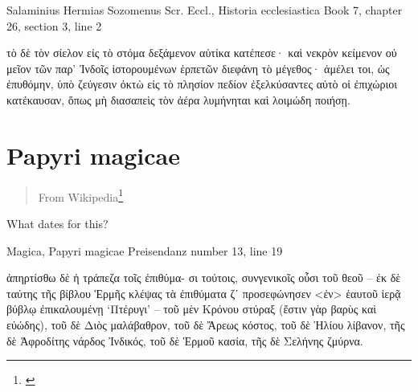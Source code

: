 \documentclass[12pt,letterpaper,twoside,final]{memoir}
\begin{document}
\begin{greek}
Salaminius Hermias Sozomenus Scr. Eccl., Historia ecclesiastica 
Book 7, chapter 26, section 3, line 2

       τὸ δὲ τὸν σίελον εἰς τὸ στόμα δεξάμενον αὐτίκα κατέπεσε· καὶ 
νεκρὸν κείμενον οὐ μεῖον τῶν παρ' Ἰνδοῖς ἱστορουμένων ἑρπετῶν διεφάνη 
τὸ μέγεθος· ἀμέλει τοι, ὡς ἐπυθόμην, ὑπὸ ζεύγεσιν ὀκτὼ εἰς τὸ πλησίον 
πεδίον ἐξελκύσαντες αὐτὸ οἱ ἐπιχώριοι κατέκαυσαν, ὅπως μὴ διασαπεὶς τὸν 
ἀέρα λυμήνηται καὶ λοιμώδη ποιήσῃ. 

\end{greek}

\section{Papyri magicae}%
\blockquote[From Wikipedia\footnote{\url{}}]{}
\begin{greek}

What dates for this?

Magica, Papyri magicae 
Preisendanz number 13, line 19

            ἀπηρτίσθω δὲ ἡ τράπεζα τοῖς ἐπιθύμα-
σι τούτοις, συνγενικοῖς οὖσι τοῦ θεοῦ – ἐκ δὲ ταύτης τῆς 
βίβλου Ἑρμῆς κλέψας τὰ ἐπιθύματα ζʹ προσεφώνησεν <ἐν> 
ἑαυτοῦ ἱερᾷ βύβλῳ ἐπικαλουμένῃ ‘Πτέρυγι’ – τοῦ μὲν 
Κρόνου στύραξ (ἔστιν γὰρ βαρὺς καὶ εὐώδης), τοῦ δὲ Διὸς 
μαλάβαθρον, τοῦ δὲ Ἄρεως κόστος, τοῦ δὲ Ἡλίου λίβανον, 
τῆς δὲ Ἀφροδίτης νάρδος Ἰνδικός, τοῦ δὲ Ἑρμοῦ κασία, 
τῆς δὲ Σελήνης ζμύρνα. 

\end{greek}
\end{document}
